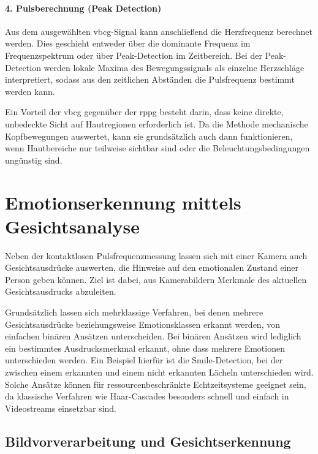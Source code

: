 \paragraph{4. Pulsberechnung (Peak Detection)} Aus dem ausgewählten \ac{vbcg}-Signal kann anschließend die Herzfrequenz berechnet werden. Dies geschieht entweder über die dominante Frequenz im Frequenzspektrum oder über Peak-Detection im Zeitbereich. Bei der Peak-Detection werden lokale Maxima des Bewegungssignals als einzelne Herzschläge interpretiert, sodass aus den zeitlichen Abständen die Pulsfrequenz bestimmt werden kann.

Ein Vorteil der \ac{vbcg} gegenüber der \ac{rppg} besteht darin, dass keine direkte, unbedeckte Sicht auf Hautregionen erforderlich ist. Da die Methode mechanische Kopfbewegungen auswertet, kann sie grundsätzlich auch dann funktionieren, wenn Hautbereiche nur teilweise sichtbar sind oder die Beleuchtungsbedingungen ungünstig sind.

\section{Emotionserkennung mittels Gesichtsanalyse}

Neben der kontaktlosen Pulsfrequenzmessung lassen sich mit einer Kamera auch Gesichtsausdrücke auswerten, die Hinweise auf den emotionalen Zustand einer Person geben können. Ziel ist dabei, aus Kamerabildern Merkmale des aktuellen Gesichtsausdrucks abzuleiten.

Grundsätzlich lassen sich mehrklassige Verfahren, bei denen mehrere Gesichtsausdrücke beziehungsweise Emotionsklassen erkannt werden, von einfachen binären Ansätzen unterscheiden. Bei binären Ansätzen wird lediglich ein bestimmtes Ausdrucksmerkmal erkannt, ohne dass mehrere Emotionen unterschieden werden. Ein Beispiel hierfür ist die Smile-Detection, bei der zwischen einem erkannten und einem nicht erkannten Lächeln unterschieden wird. Solche Ansätze können für ressourcenbeschränkte Echtzeitsysteme geeignet sein, da klassische Verfahren wie Haar-Cascades besonders schnell und einfach in Videostreams einsetzbar sind.


\subsection{Bildvorverarbeitung und Gesichtserkennung}

